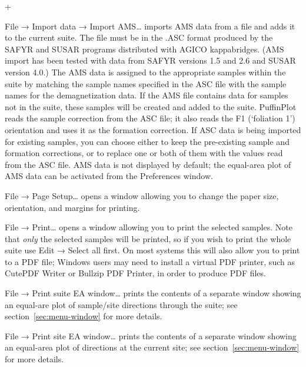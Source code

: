 \documentclass[a4paper,british]{article}
\newcommand{\menuitemlabel}[1]{%
\mbox{\textsf{#1}}\hfil}
\newenvironment{menuitemlist}%
{\begin{list}{}{%
\renewcommand{\makelabel}{\menuitemlabel}%
\setlength{\labelwidth}{35pt}%
\setlength{\leftmargin}%
             {\labelwidth+\labelsep}}}%
{\end{list}}
\newcommand{\ppcmd}[1]{\textsf{#1}} %
\newcommand{\caps}[1]{\MakeTextUppercase{#1}} %
\newcommand{\submenu}{ \textrm{→} }
\begin{document}
\begin{menuitemlist}
\item[File\submenu Import data\submenu Import AMS\ldots] imports
  \caps{ams} data from a file and adds it to the current suite. The file
  must be in the \caps{.asc} format produced by the \caps{Safyr} and
  \caps{Susar} programs distributed with \caps{Agico} kappabridges.
  (\caps{Ams} import has been tested with data from \caps{Safyr}
  versions 1.5 and 2.6 and \caps{Susar} version 4.0.) The \caps{ams}
  data is assigned to the appropriate samples within the suite by
  matching the sample names specified in the \caps{asc} file with the
  sample names for the demagnetization data. If the \caps{ams} file
  contains data for samples not in the suite, these samples will be
  created and added to the suite. PuffinPlot reads the sample correction
  from the \caps{asc} file; it also reads the F1 (`foliation 1')
  orientation and uses it as the formation correction. If \caps{asc}
  data is being imported for existing samples, you can choose either to
  keep the pre-existing sample and formation corrections, or to replace
  one or both of them with the values read from the \caps{asc} file.
  \caps{Ams} data is not displayed by default; the equal-area plot of
  \caps{ams} data can be activated from the \ppcmd{Preferences} window.

\item[File\submenu Page Setup\ldots] opens a window allowing you
to change the paper size, orientation, and margins for printing.

\item[File\submenu Print\ldots] opens a window allowing you to print the
  selected samples. Note that {\em only} the selected samples will be
  printed, so if you wish to print the whole suite use \ppcmd{Edit\submenu
    Select all} first. On most systems this will also allow you to print to a
  \caps{pdf} file; Windows users may need to install a virtual \caps{pdf}
  printer, such as Cute\caps{pdf} Writer or Bullzip \caps{pdf} Printer, in
  order to produce \caps{pdf} files.

\item[File\submenu Print suite EA window\ldots] prints the contents of a
  separate window showing an equal-are plot of sample/site directions through
  the suite; see section~\ref{sec:menu-window} for more details.

\item[File\submenu Print site EA window\ldots] prints the contents of a
  separate window showing an equal-area plot of directions at the current
  site; see section~\ref{sec:menu-window} for more details.


\end{menuitemlist}
\end{document}
